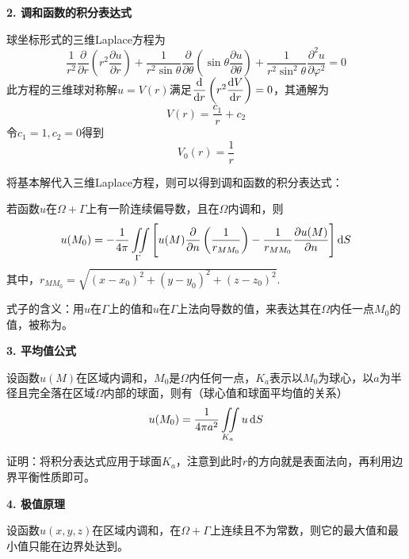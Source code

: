 \noindent \textbf{2. 调和函数的积分表达式}

\theorem[三维Laplace方程的基本解]
球坐标形式的三维Laplace方程为
\begin{equation}
	\dfrac{1}{r^2}\dfrac{\partial }{\partial r}\left(r^2 \dfrac{\partial u}{\partial r}\right) + \dfrac{1}{r^2 \sin \theta} \dfrac{\partial }{\partial \theta}\left(\sin \theta \dfrac{\partial u}{\partial \theta}\right) + \dfrac{1}{r^2 \sin^2 \theta}\dfrac{\partial^2 u}{\partial \varphi^2} = 0
\end{equation}
此方程的三维球对称解$u = V(r)$满足$\dfrac{{\rm{d}}}{{\rm{d}} r}\left( r^2 \dfrac{{\rm{d}} V}{{\rm{d}} r} \right) = 0$，其通解为
\begin{equation}
	V(r) = \dfrac{c_1}{r} + c_2
\end{equation}
令$c_1 = 1, c_2 = 0$得到
\begin{equation}
	V_0(r) = \dfrac{1}{r}
\end{equation}

将基本解代入三维Laplace方程，则可以得到调和函数的积分表达式：

若函数$u$在$\Omega + \Gamma$上有一阶连续偏导数，且在$\Omega$内调和，则
\begin{equation}
	u(M_0) = - \dfrac{1}{4\pi} \iint\limits_{\Gamma}\Bigg[u(M)\dfrac{\partial }{\partial n} \left(\dfrac{1}{r_{MM_0}}\right) - \dfrac{1}{r_{MM_0}}\dfrac{\partial u(M)}{\partial n}\Bigg]\, {\rm{d}} S
\end{equation}
其中，$r_{MM_0} = \sqrt{(x - x_0)^2  + (y - y_0)^2 + (z-z_0)^2}.$

式子的含义：用$u$在$\Gamma $上的值和$u$在$\Gamma$上法向导数的值，来表达其在$\Omega$内任一点$M_0$的值，被称为。
\vspace*{1em}

\noindent \textbf{3. 平均值公式}

设函数$u(M)$在区域内调和，$M_0$是$\Omega$内任何一点，$K_a$表示以$M_0$为球心，以$a$为半径且完全落在区域$\Omega$内部的球面，则有（球心值和球面平均值的关系）
\begin{equation}
	u(M_0) = \dfrac{1}{4 \pi a^2} \iint\limits_{K_a}u\, {\rm{d}} S
\end{equation}

证明：将积分表达式应用于球面$K_a$，注意到此时$r$的方向就是表面法向，再利用边界平衡性质即可。

\noindent \textbf{4. 极值原理}

设函数$u(x,y,z)$在区域内调和，在$\Omega + \Gamma$上连续且不为常数，则它的最大值和最小值只能在边界处达到。

